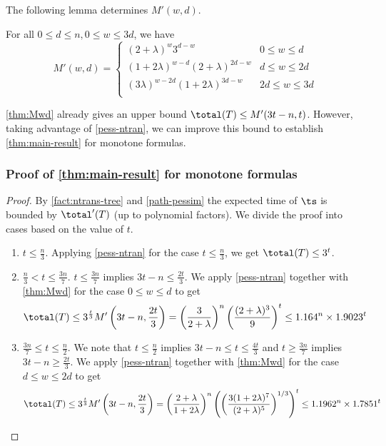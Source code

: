 The following lemma determines $M'(w,d)$.

\begin{lemma} 
\label{thm:Mwd}
For all $0\le d\le n, 0\le w\le 3d$, we have
\[
M'(w,d) = 
\begin{cases}
(2+\lambda)^{w}3^{d-w} & 0\le w \le d\\
(1+2\lambda)^{w-d}(2+\lambda)^{2d-w} & d\le w\le 2d\\
(3\lambda)^{w-2d}(1+2\lambda)^{3d-w} & 2d\le w\le 3d\\
\end{cases}
\]
\end{lemma}

\cref{thm:Mwd} already gives an upper bound $\total(T) \le M'(3t - n, t)$. 
However, taking advantage 
of \cref{pess-ntran},
we can improve this bound 
to establish
\cref{thm:main-result} for monotone formulas.  

\subsubsection{Proof of \cref{thm:main-result} for monotone formulas}

\begin{proof}
\label{proof:monotone-main-result}
By \cref{fact:ntrans-tree} and \cref{path-pessim} the expected time of $\ts$ is bounded by 
$\total'(T)$ (up to polynomial factors). 
We divide the proof into cases based on the value of $t$.
\begin{enumerate}[label=\textbf{Case \arabic*:}, itemindent=*, leftmargin=0em]

\item
$t\le \frac{n}{3}$. Applying \cref{pess-ntran} for the case $t\le \frac{n}{3}$, we 
get $\total(T) \le 3^t$.

\item
$\frac{n}{3} < t \le \frac{3n}{7}$.
$t \le \frac{3n}{7}$ implies $3t-n \le \frac{2t}{3}$.
We apply
\cref{pess-ntran} together with 
\cref{thm:Mwd} for the case $0\le w\le d$ to get 
\[
\total(T) \le 3^{\frac{t}{3}} M'\left(3t-n, \frac{2t}{3}\right) = \left(\frac{3}{2+\lambda}\right)^n\left(\frac{(2+\lambda)^3}{9}\right)^t \le 1.164^n \times 1.9023^t
\]

\item
$\frac{3n}{7}\le t \le \frac{n}{2}$. 
We note that $t \le \frac{n}{2}$ implies 
$3t-n \le t \le \frac{4t}{3}$ and $t \ge \frac{3n}{7}$ implies $3t-n \ge \frac{2t}{3}$. 
We apply
\cref{pess-ntran} together with 
\cref{thm:Mwd} for the case $d\le w\le 2d$ to get 
\[
\total(T) \le 3^{\frac{t}{3}} M'\left(3t-n, \frac{2t}{3}\right) = \left(\frac{2+\lambda}{1+2\lambda}\right)^n \left(\left(\frac{3(1+2\lambda)^{7}}{(2+\lambda)^{5}}\right)^{1/3}\right)^t \le 1.1962^n \times 1.7851^t
\]
\end{enumerate}
\end{proof}

